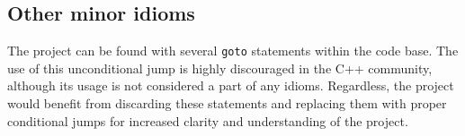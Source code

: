 \subsection{Other minor idioms}
The project can be found with several \texttt{goto} statements within the code base. The use of this unconditional jump is highly discouraged in the C++ community, although its usage is not considered a part of any idioms. Regardless, the project would benefit from discarding these statements and replacing them with proper conditional jumps for increased clarity and understanding of the project.

